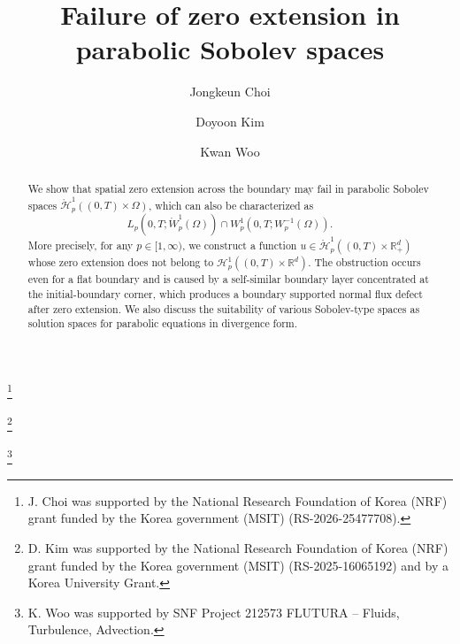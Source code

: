 \documentclass[reqno]{amsart}
\numberwithin{equation}{section}
\theoremstyle{plain}
\theoremstyle{definition}
\def\bR{\mathbb{R}}
\def\cH{\mathcal{H}}
\begin{document}
\title[]{Failure of zero extension in parabolic Sobolev spaces}


\author[J. Choi]{Jongkeun Choi}
\address[J. Choi]{Department of Mathematics Education, Pusan National University,  Busan, 46241, Republic of Korea}
\thanks{J. Choi was supported by the National Research Foundation of Korea (NRF) grant funded by the Korea government (MSIT) (RS-2026-25477708).}

\author[D. Kim]{Doyoon Kim}
\address[D. Kim]{Department of Mathematics, Korea University, 145 Anam-ro, Seongbuk-gu, Seoul, 02841, Republic of Korea}
\thanks{D. Kim was supported by the National Research Foundation of Korea (NRF) grant funded by the Korea government (MSIT) (RS-2025-16065192) and by a Korea University Grant.}


\author[K. Woo]{Kwan Woo}
\address[K. Woo]{Departement Mathematik und Informatik, Universit\"at Basel, CH-4051 Basel, Switzerland}
\thanks{K. Woo was supported by SNF Project 212573 FLUTURA – Fluids, Turbulence, Advection.}



\begin{abstract}
We show that spatial zero extension across the boundary may fail in parabolic Sobolev spaces $\mathring{\cH}^1_p((0,T) \times \Omega)$, which can also be characterized as
$$
L_p(0,T;\mathring{W}^1_p(\Omega))\cap W^1_p(0,T; W^{-1}_{p}(\Omega)).
$$
More precisely, for any $p\in [1, \infty)$, we construct a function $u\in \mathring{\cH}^1_p((0,T)\times \bR^d_+)$ whose zero extension does not belong to $\cH^1_p((0,T)\times \bR^d)$.
The obstruction occurs even for a flat boundary and is caused by a self-similar boundary layer concentrated at the initial-boundary corner, which produces a boundary supported normal flux defect after zero extension.
We also discuss the suitability of various Sobolev-type spaces as solution spaces for parabolic equations in divergence form.
\end{abstract}

\maketitle

\end{document}
